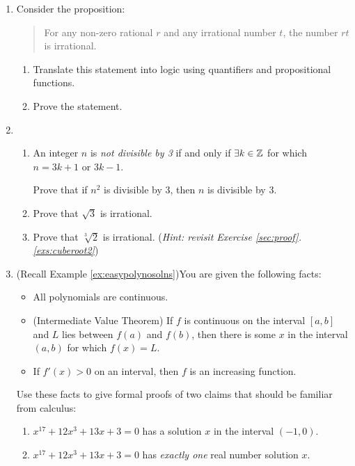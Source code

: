 \begin{exercises}{}{}
\begin{enumerate}
	
		\item Consider the proposition:
	  \begin{quote}
	      For any non-zero rational $r$ and any irrational number $t$, the number $rt$ is irrational.
	  \end{quote}
	  \begin{enumerate}
	      \item Translate this statement into logic using quantifiers and propositional functions.
	      \item Prove the statement.
	  \end{enumerate}
	
		
		\item\begin{enumerate}
		  \item An integer $n$ is \emph{not divisible by 3} if and only if $\exists k\in\mathbb{Z}$ for which $n=3k+1$ or $3k-1$.\par
		  Prove that if $n^2$ is divisible by 3, then $n$ is divisible by 3.
		  \item Prove that $\sqrt 3$ is irrational.
		  \item Prove that $\sqrt[3]{2}$ is irrational. (\emph{Hint: revisit Exercise \ref*{sec:proof}.\ref{exs:cuberoot2}}) 
		\end{enumerate}
	

	  \item (Recall Example \ref{ex:easypolynosolns})\lstsp You are given the following facts:
	  \begin{itemize}
	    \item All polynomials are continuous.
	    \item (Intermediate Value Theorem) If $f$ is continuous on the interval $[a,b]$ and $L$ lies between $f(a)$ and $f(b)$, then there is some $x$ in the interval $(a,b)$ for which $f(x)=L$.
	    \item If $f'(x)>0$ on an interval, then $f$ is an increasing function.
		\end{itemize}
		Use these facts to give formal proofs of two claims that should be familiar from calculus:
		\begin{enumerate}
		  \item $x^{17}+12x^3+13x+3=0$ has a solution $x$ in the interval $(-1,0)$.
		  \item $x^{17}+12x^3+13x+3=0$ has \emph{exactly one} real number solution $x$.
		\end{enumerate}
	
	
		\goodbreak
	

\end{enumerate}
\end{exercises}
